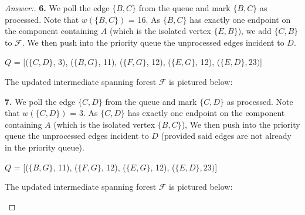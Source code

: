\documentclass[11pt]{article}
\theoremstyle{definition}
\theoremstyle{definition}
\theoremstyle{definition}
\begin{document}
\begin{proof}[Answer:]
\item \textbf{6.} We poll the edge $\{B, C\}$ from the queue and mark $\{B, C\}$ as processed. Note that $w(\{B, C\})$ = 16. As $\{B, C\}$ has exactly one endpoint on the component containing $A$ (which is the isolated vertex $\{E, B\}$), we add $\{C, B\}$ to $\mathcal{F}$. We then push into the priority queue the unprocessed edges incident to $D$.
\begin{center}
\item $Q$ = [($\{C, D\}$, 3), ($\{B, G\}$, 11), ($\{F, G\}$, 12), ($\{E, G\}$, 12), ($\{E, D\}, 23)$]
\item The updated intermediate spanning forest $\mathcal{F}$ is pictured below: \\

\end{center}

\item \textbf{7.} We poll the edge $\{C, D\}$ from the queue and mark $\{C, D\}$ as processed. Note that $w(\{C, D\})$ = 3. As $\{C, D\}$ has exactly one endpoint on the component containing $A$ (which is the isolated vertex $\{B, C\}$), We then push into the priority queue the unprocessed edges incident to $D$ (provided said edges are not already in the priority queue).
\begin{center}
\item $Q$ = [($\{B, G\}$, 11), ($\{F, G\}$, 12), ($\{E, G\}$, 12), ($\{E, D\}, 23)$]
\item The updated intermediate spanning forest $\mathcal{F}$ is pictured below: \\

\begin{tikzpicture}[scale=0.4, auto, node distance=3cm, every loop/.style={},
  thick,main node/.style={circle,draw,font=\sffamily\Large\bfseries}]


\end{tikzpicture}
\end{center}
\end{proof}
\end{document}
